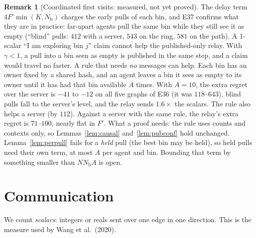 \documentclass[11pt]{article}
\theoremstyle{definition}
\newtheorem{remark}{Remark}
\newcommand{\Nb}{N_{\mathrm b}}
\begin{document}
\begin{remark}[Coordinated first visits: measured, not yet proved]\label{rem:owners}
The delay term $4F'\min(K,\Nb)$ charges the early pulls of each bin, and E37 confirms what they are in practice: far-apart
agents pull the same bin while they still see it as empty (``blind'' pulls: $412$ with a server, $543$ on the ring,
$581$ on the path). A 1-scalar ``I am exploring bin $j$'' claim cannot help the published-only relay. With $\gamma<1$, a
pull into a bin seen as empty is published in the same step, and a claim would travel no faster. A rule that needs
\emph{no} messages can help. Each bin has an owner fixed by a shared hash, and an agent leaves a bin it sees as empty
to its owner until it has had that bin available $A$ times. With $A=10$, the extra regret over the server is $-41$ to
$-12$ on all five graphs of E36 (it was $118$--$643$), blind pulls fall to the server's level, and the relay sends
$1.6\times$ the scalars. The rule also helps a server (by $112$). Against a server with the same rule, the relay's extra regret is
$71$--$100$, nearly flat in $F'$.
What a proof needs: the rule uses counts and contexts only, so Lemmas~\ref{lem:causal} and~\ref{lem:pubconf} hold
unchanged. Lemma~\ref{lem:perpull} fails for a \emph{held} pull (the best bin may be held), so held pulls need their own
term, at most $A$ per agent and bin. Bounding that term by something smaller than $N\Nb A$ is open.
\end{remark}

\section{Communication}\label{sec:comm}

We count \emph{scalars}: integers or reals sent over one edge in one direction. This is the measure used by
Wang et al.\ (2020).
\end{document}
